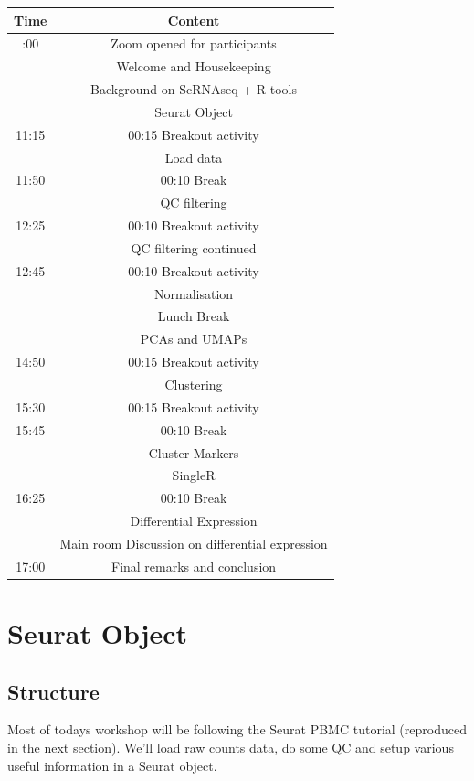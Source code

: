 \documentclass[
]{book}
\begin{document}
\begin{longtable}[]{@{}cc@{}}
\toprule\noalign{}
Time & Content \\
\midrule\noalign{}
\endhead
\bottomrule\noalign{}
\endlastfoot
10:00 & Zoom opened for participants \\
& Welcome and Housekeeping \\
& Background on ScRNAseq + R tools \\
& Seurat Object \\
11:15 & 00:15 Breakout activity \\
& Load data \\
11:50 & 00:10 Break \\
& QC filtering \\
12:25 & 00:10 Breakout activity \\
& QC filtering continued \\
12:45 & 00:10 Breakout activity \\
& Normalisation \\
& Lunch Break \\
& PCAs and UMAPs \\
14:50 & 00:15 Breakout activity \\
& Clustering \\
15:30 & 00:15 Breakout activity \\
15:45 & 00:10 Break \\
& Cluster Markers \\
& SingleR \\
16:25 & 00:10 Break \\
& Differential Expression \\
& Main room Discussion on differential expression \\
17:00 & Final remarks and conclusion \\
\end{longtable}

\part{Seurat Object}\label{part-seurat-object}

\chapter{Structure}\label{structure}

Most of todays workshop will be following the Seurat PBMC tutorial (reproduced in the next section).
We'll load raw counts data, do some QC and setup various useful information in a Seurat object.
\end{document}
